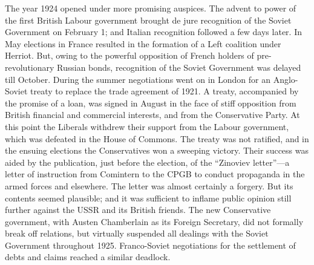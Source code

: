The year 1924 opened under more promising auspices. The advent to power of the first British Labour government brought de jure recognition of the Soviet Government on February 1; and Italian recognition followed a few days later. In May elections in France resulted in the formation of a Left coalition under Herriot. But, owing to the powerful opposition of French holders of pre-revolutionary Russian bonds, recognition of the Soviet Government was delayed till October. During the summer negotiations went on in London for an Anglo-Soviet treaty to replace the trade agreement of 1921. A treaty, accompanied by the promise of a loan, was signed in August in the face of stiff opposition from British financial and commercial interests, and from the Conservative Party. At this point the Liberals withdrew their support from the Labour government, which was defeated in the House of Commons. The treaty was not ratified, and in the ensuing elections the Conservatives won a sweeping victory. Their success was aided by the publication, just before the election, of the ``Zinoviev letter''---a letter of instruction from Comintern to the CPGB to conduct propaganda in the armed forces and elsewhere. The letter was almost certainly a forgery. But its contents seemed plausible; and it was sufficient to inflame public opinion still further against the USSR and its British friends. The new Conservative government, with Austen Chamberlain as its Foreign Secretary, did not formally break off relations, but virtually suspended all dealings with the Soviet Government throughout 1925. Franco-Soviet negotiations for the settlement of debts and claims reached a similar deadlock. 

